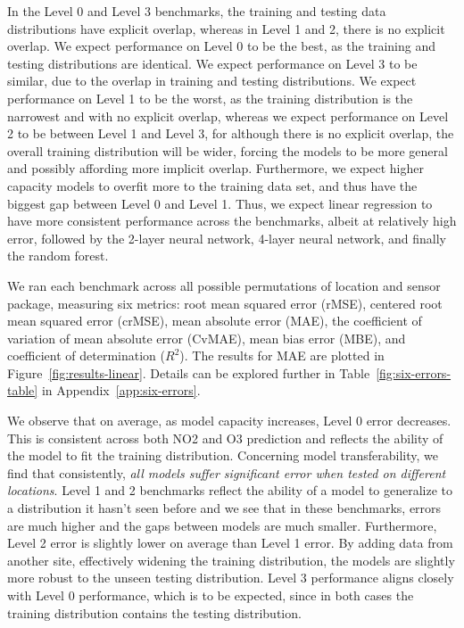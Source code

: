 \documentclass[journal abbreviation, manuscript]{copernicus}
\begin{document}
In the Level 0 and Level 3 benchmarks, the training and testing data distributions have explicit overlap, whereas in Level 1 and 2, there is no explicit overlap. We expect performance on Level 0 to be the best, as the training and testing distributions are identical.  We expect performance on Level 3 to be similar, due to the overlap in training and testing distributions. We expect performance on Level 1 to be the worst, as the training distribution is the narrowest and with no explicit overlap, whereas we expect performance on Level 2 to be between Level 1 and Level 3, for although there is no explicit overlap, the overall training distribution will be wider, forcing the models to be more general and possibly affording more implicit overlap.  Furthermore, we expect higher capacity models to overfit more to the training data set, and thus have the biggest gap between Level 0 and Level 1. Thus, we expect linear regression to have more consistent performance across the benchmarks, albeit at relatively high error, followed by the 2-layer neural network, 4-layer neural network, and finally the random forest.

We ran each benchmark across all possible permutations of location and sensor package, measuring six metrics: root mean squared error (rMSE), centered root mean squared error (crMSE), mean absolute error (MAE), the coefficient of variation of mean absolute error (CvMAE), mean bias error (MBE), and coefficient of determination ($R^2$). The results for MAE are plotted in Figure~\ref{fig:results-linear}.  Details can be explored further in Table~\ref{fig:six-errors-table} in Appendix~\ref{app:six-errors}.

We observe that on average, as model capacity increases, Level 0 error decreases. This is consistent across both NO2 and O3 prediction and reflects the ability of the model to fit the training distribution. Concerning model transferability, we find that consistently, \emph{all models suffer significant error when tested on different locations}. Level 1 and 2 benchmarks reflect the ability of a model to generalize to a distribution it hasn't seen before and we see that in these benchmarks, errors are much higher and the gaps between models are much smaller. Furthermore, Level 2 error is slightly lower on average than Level 1 error. By adding data from another site, effectively widening the training distribution, the models are slightly more robust to the unseen testing distribution. Level 3 performance aligns closely with Level 0 performance, which is to be expected, since in both cases the training distribution contains the testing distribution.
\end{document}

